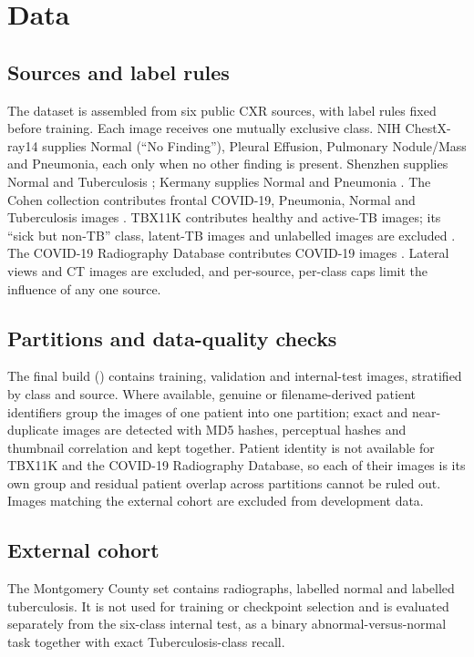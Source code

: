 \section{Data}\label{sec:data}
\subsection{Sources and label rules}
The dataset is assembled from six public CXR sources, with label rules fixed before training. Each image
receives one mutually exclusive class. NIH ChestX-ray14 \cite{wang2017chestxray8} supplies Normal (``No
Finding''), Pleural Effusion, Pulmonary Nodule/Mass and Pneumonia, each only when no other finding is
present. Shenzhen supplies Normal and Tuberculosis \cite{jaeger2014two}; Kermany supplies Normal and
Pneumonia \cite{kermany2018identifying}. The Cohen collection contributes frontal COVID-19, Pneumonia,
Normal and Tuberculosis images \cite{cohen2020covid}. TBX11K contributes healthy and active-TB images;
its ``sick but non-TB'' class, latent-TB images and unlabelled images are excluded
\cite{liu2020rethinking}. The COVID-19 Radiography Database contributes COVID-19 images
\cite{chowdhury2020can,rahman2021exploring}. Lateral views and CT images are excluded, and
per-source, per-class caps limit the influence of any one source.

\subsection{Partitions and data-quality checks}
The final build (\RDatasetBuild) contains \RNTrain{} training, \RNVal{} validation and \RNTest{}
internal-test images, stratified by class and source. Where available, genuine or filename-derived
patient identifiers group the images of one patient into one partition; exact and near-duplicate images
are detected with MD5 hashes, perceptual hashes and thumbnail correlation and kept together. Patient
identity is not available for TBX11K and the COVID-19 Radiography Database, so each of their images is
its own group and residual patient overlap across partitions cannot be ruled out. Images matching the
external cohort are excluded from development data.

\subsection{External cohort}
The Montgomery County set \cite{jaeger2014two} contains \RNExternal{} radiographs, \RExtSpecN{} labelled
normal and \RExtTBN{} labelled tuberculosis. It is not used for training or checkpoint selection and is
evaluated separately from the six-class internal test, as a binary abnormal-versus-normal task together
with exact Tuberculosis-class recall.
